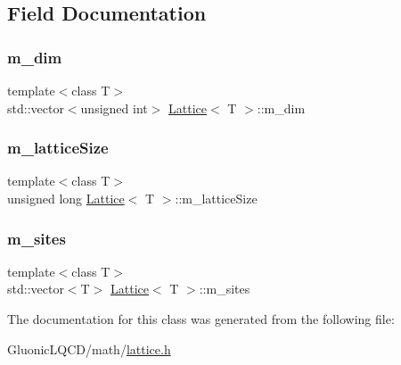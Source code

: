 \subsection{Field Documentation}
\mbox{\label{class_lattice_a6adf73dcd2ef1663d7d38b192f7fd91e}} 
\subsubsection{\texorpdfstring{m\_dim}{m\_dim}}
{\footnotesize\ttfamily template$<$class T$>$ \\
std\+::vector$<$unsigned int$>$ \mbox{\hyperlink{class_lattice}{Lattice}}$<$ T $>$\+::m\+\_\+dim}

\mbox{\label{class_lattice_a933045fb4a76f62d29472e6061ed8a34}} 
\subsubsection{\texorpdfstring{m\_latticeSize}{m\_latticeSize}}
{\footnotesize\ttfamily template$<$class T$>$ \\
unsigned long \mbox{\hyperlink{class_lattice}{Lattice}}$<$ T $>$\+::m\+\_\+lattice\+Size}

\mbox{\label{class_lattice_a605a93a5b2a973811f7cff44a8ab84f7}} 
\subsubsection{\texorpdfstring{m\_sites}{m\_sites}}
{\footnotesize\ttfamily template$<$class T$>$ \\
std\+::vector$<$T$>$ \mbox{\hyperlink{class_lattice}{Lattice}}$<$ T $>$\+::m\+\_\+sites}



The documentation for this class was generated from the following file\+:\begin{DoxyCompactItemize}
\item 
Gluonic\+L\+Q\+C\+D/math/\mbox{\hyperlink{lattice_8h}{lattice.\+h}}\end{DoxyCompactItemize}
